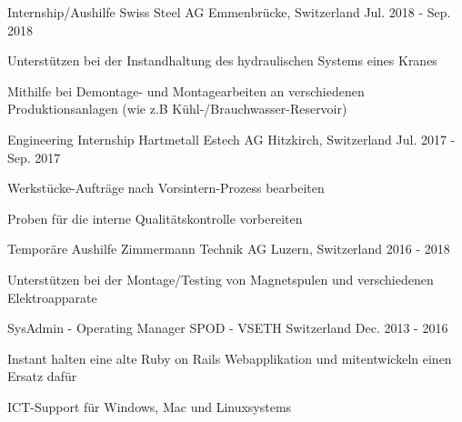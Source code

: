 

\begin{cventries}

\cventry
	{Internship/Aushilfe} %
	{Swiss Steel AG} %
	{Emmenbrücke, Switzerland} %
	{Jul. 2018 - Sep. 2018} %
	{
		\begin{cvitems} %
			\item {Unterstützen bei der Instandhaltung des hydraulischen Systems eines Kranes}
			\item {Mithilfe bei Demontage- und Montagearbeiten an verschiedenen Produktionsanlagen (wie z.B Kühl-/Brauchwasser-Reservoir)}
		\end{cvitems}
}	

\cventry
	{Engineering Internship} %
	{Hartmetall Estech AG} %
	{Hitzkirch, Switzerland} %
	{Jul. 2017 - Sep. 2017} %
	{
		\begin{cvitems} %
			\item {Werkstücke-Aufträge nach Vorsintern-Prozess bearbeiten}
			\item {Proben für die interne Qualitätskontrolle vorbereiten}
		\end{cvitems}
}

\cventry
	{Temporäre Aushilfe} %
	{Zimmermann Technik AG} %
	{Luzern, Switzerland} %
	{2016 - 2018} %
	{
		\begin{cvitems} %
			\item {Unterstützen bei der Montage/Testing von Magnetspulen und verschiedenen Elektroapparate}
		\end{cvitems}
	}	

  \cventry
    {SysAdmin - Operating Manager} %
    {SPOD - VSETH} %
    {Switzerland} %
    {Dec. 2013 - 2016} %
    {
      \begin{cvitems} %
        \item {Instant halten eine alte Ruby on Rails Webapplikation und mitentwickeln einen Ersatz dafür}
        \item {ICT-Support für Windows, Mac und Linuxsystems}
      \end{cvitems}
    }


\end{cventries}
